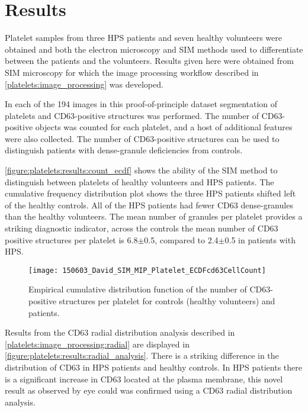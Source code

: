 \section{Results}
\label{platelets:results}
Platelet samples from three HPS patients and seven healthy volunteers were obtained and both the electron microscopy and SIM methods used to differentiate between the patients and the volunteers. Results given here were obtained from SIM microscopy for which the image processing workflow described in \autoref{platelets:image_processing} was developed.

In each of the 194 images in this proof-of-principle dataset segmentation of platelets and CD63-positive structures was performed. The number of CD63-positive objects was counted for each platelet, and a host of additional features were also collected. The number of CD63-positive structures can be used to distinguish patients with dense-granule deficiencies from controls.

\autoref{figure:platelets:results:count_ecdf} shows the ability of the SIM method to distinguish between platelets of healthy volunteers and HPS patients. The cumulative frequency distribution plot shows the three HPS patients shifted left of the healthy controls. All of the HPS patients had fewer CD63 dense-granules than the healthy volunteers. The mean number of granules per platelet provides a striking diagnostic indicator, across the controls the mean number of CD63 positive structures per platelet is 6.8$\pm$0.5, compared to 2.4$\pm$0.5 in patients with HPS.

\begin{figure}[htbp]{}
	\centering
	\texttt{[image: 150603\_David\_SIM\_MIP\_Platelet\_ECDFcd63CellCount]}
\caption[Platelet CD63-positive structures empirical cumulative frequency]{Empirical cumulative distribution function of the number of CD63-positive structures per platelet for controls (healthy volunteers) and patients.}
\label{figure:platelets:results:count_ecdf}
\end{figure}

Results from the CD63 radial distribution analysis described in \autoref{platelets:image_processing:radial} are displayed in \autoref{figure:platelets:results:radial_analysis}. There is a striking difference in the distribution of CD63 in HPS patients and healthy controls. In HPS patients there is a significant increase in CD63 located at the plasma membrane, this novel result as observed by eye could was confirmed using a CD63 radial distribution analysis.

